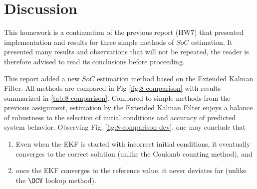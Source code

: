 \section{Discussion}

This homework is a continuation of the previous report (HW7) that presented implementation and results for three simple methods of $SoC$ estimation. It presented many results and observations that will not be repeated, the reader is therefore advised to read its conclusions  before proceeding.

This report added a new $SoC$ estimation method based on the Extended Kalman Filter. All methods are compared in Fig \ref{fig:8-comparison} with results summarized in \ref{tab:8-comparison}. Compared to simple methods from the previous assignment, estimation by the Extended Kalman Filter enjoys a balance of robustness to the selection of initial conditions and accuracy of predicted system behavior. Observing Fig. \ref{fig:8-comparison-dev}, one may conclude that
\begin{enumerate}
    \item Even when the EKF is started with incorrect initial conditions, it eventually converges to the correct solution (unlike the Coulomb counting method), and
    \item once the EKF converges to the reference value, it never deviates far (unlike the $\OCV$ lookup method).
\end{enumerate}


